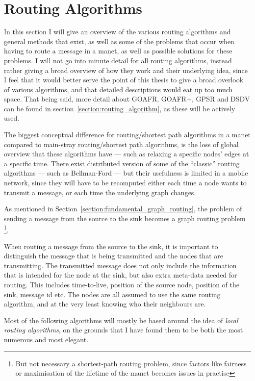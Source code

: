 \section{Routing Algorithms}
\label{section:routing_algorithms}

In this section I will give an overview of the various routing algorithms and general methods that exist, as well as some of the problems that occur when having to route a message in a \ac{manet}, as well as possible solutions for these problems. I will not go into minute detail for all routing algorithms, instead rather giving a broad overview of how they work and their underlying idea, since I feel that it would better serve the point of this thesis to give a broad overlook of various algorithms, and that detailed descriptions would eat up too much space. That being said, more detail about GOAFR, GOAFR+, GPSR and DSDV can be found in section~\ref{section:routing_algorithm}, as these will be actively used.

The biggest conceptual difference for routing/shortest path algorithms in a \ac{manet} compared to main-stray routing/shortest path algorithms, is the loss of global overview that these algorithms have --- such as relaxing a specific nodes' edges at a specific time. There exist distributed version of some of the ``classic'' routing algorithms --- such as Bellman-Ford --- but their usefulness is limited in a mobile network, since they will have to be recomputed either each time a node wants to transmit a message, or each time the underlying graph changes.

As mentioned in Section~\ref{section:fundamental_graph_routing}, the problem of sending a message from the source to the sink  becomes a graph routing problem \footnote{But not necessary a shortest-path routing problem, since factors like fairness or maximisation of the lifetime of the \ac{manet} becomes issues in practise}.

When routing a message from the source to the sink, it is important to distinguish the message that is being transmitted and the nodes that are transmitting. The transmitted message does not only include the information that is intended for the node at the sink, but also extra meta-data needed for routing. This includes time-to-live, position of the source node, position of the sink, message id etc. The nodes are all assumed to use the same routing algorithm, and at the very least knowing who their neighbours are.

Most of the following algorithms will mostly be based around the idea of \emph{local routing algorithms}, on the grounds that I have found them to be both the most numerous and most elegant.

